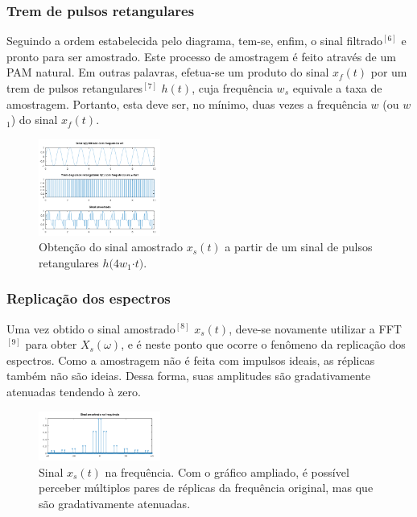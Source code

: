 \documentclass[journal]{IEEEtran}
\begin{document}
\subsubsection{Trem de pulsos retangulares}

Seguindo a ordem estabelecida pelo diagrama, tem-se, enfim, o sinal filtrado$^{[6]}$ e pronto para ser amostrado. Este processo de amostragem é feito através de um PAM natural. Em outras palavras, efetua-se um produto do sinal $x$$_f$$(t)$ por um trem de pulsos retangulares$^{[7]}$ $h(t)$, cuja frequência $w$$_s$ equivale a taxa de amostragem. Portanto, esta deve ser, no mínimo, duas vezes a frequência $w$ (ou $w$$_1$) do sinal $x$$_f$$(t)$.

\begin{figure}[H]
\captionsetup{justification=centering}
\centering %
\includegraphics[width=4cm]{ex_amostrando.png} %
\caption{Obtenção do sinal amostrado $x$$_s$$(t)$ a partir de um sinal de pulsos retangulares $h(4w$$_1$$\cdot t)$.}
\end{figure}

\subsubsection{Replicação dos espectros}

Uma vez obtido o sinal amostrado$^{[8]}$ $x$$_s$$(t)$, deve-se novamente utilizar a FFT$^{[9]}$ para obter $X$$_s$$(\omega)$, e é neste ponto que ocorre o fenômeno da replicação dos espectros. Como a amostragem não é feita com impulsos ideais, as réplicas também não são ideias. Dessa forma, suas amplitudes são gradativamente atenuadas tendendo à zero.
\onehalfspacing
\begin{figure}[H]
\captionsetup{justification=centering}
\centering %
\includegraphics[width=4cm]{ex_replicacao.png} %
\caption{Sinal $x$$_s$$(t)$ na frequência. Com o gráfico ampliado, é possível perceber múltiplos pares de réplicas da frequência original, mas que são gradativamente atenuadas.}
\end{figure}
\end{document}
